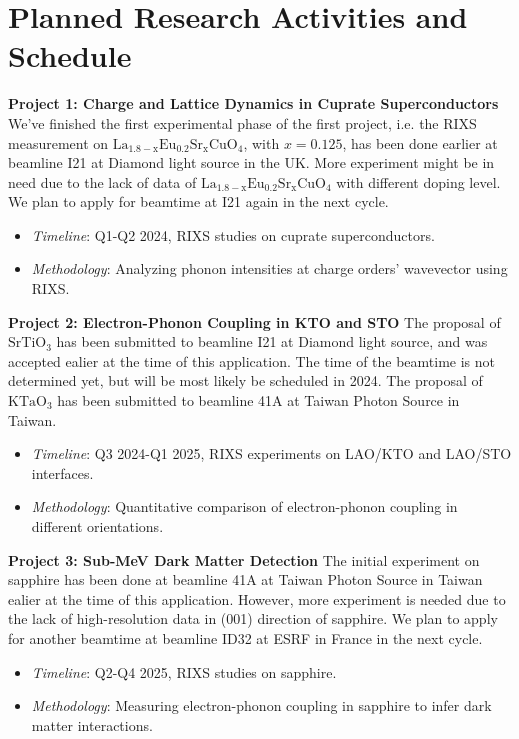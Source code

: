 \documentclass[11pt]{article}
\begin{document}
\section{Planned Research Activities and Schedule}
\textbf{Project 1: Charge and Lattice Dynamics in Cuprate Superconductors}
We've finished the first experimental phase of the first project, i.e. the RIXS measurement on $\mathrm{La_{1.8-x}Eu_{0.2}Sr_xCuO_{4}}$, with $x=0.125$, has been done earlier at beamline I21 at Diamond light source in the UK. More experiment might be in need due to the lack of data of $\mathrm{La_{1.8-x}Eu_{0.2}Sr_xCuO_{4}}$ with different doping level. We plan to apply for beamtime at I21 again in the next cycle.
\begin{itemize}
  \item \textit{Timeline}: Q1-Q2 2024, RIXS studies on cuprate superconductors.
  \item \textit{Methodology}: Analyzing phonon intensities at charge orders' wavevector using RIXS.
\end{itemize}

\textbf{Project 2: Electron-Phonon Coupling in KTO and STO}
The proposal of $\mathrm{SrTiO_{3}}$ has been submitted to beamline I21 at Diamond light source, and was accepted ealier at the time of this application. The time of the beamtime is not determined yet, but will be most likely be scheduled in 2024. The proposal of $\mathrm{KTaO_{3}}$ has been submitted to beamline 41A at Taiwan Photon Source in Taiwan. 
\begin{itemize}
  \item \textit{Timeline}: Q3 2024-Q1 2025, RIXS experiments on LAO/KTO and LAO/STO interfaces.
  \item \textit{Methodology}: Quantitative comparison of electron-phonon coupling in different orientations.
\end{itemize}

\textbf{Project 3: Sub-MeV Dark Matter Detection}
The initial experiment on sapphire has been done at beamline 41A at Taiwan Photon Source in Taiwan ealier at the time of this application. However, more experiment is needed due to the lack of high-resolution data in (001) direction of sapphire. We plan to apply for another beamtime at beamline ID32 at ESRF in France in the next cycle.
\begin{itemize}
  \item \textit{Timeline}: Q2-Q4 2025, RIXS studies on sapphire.
  \item \textit{Methodology}: Measuring electron-phonon coupling in sapphire to infer dark matter interactions.
\end{itemize}
\end{document}
